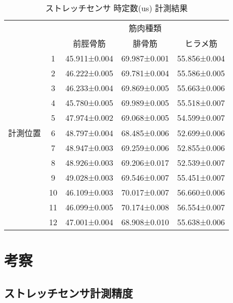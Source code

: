 \begin{table}[h]
    \caption{ストレッチセンサ 時定数(us) 計測結果}
        \begin{center}
            \begin{tabular}{|c|c|ccc|}\hline
            \multicolumn{2}{|c|}{} & \multicolumn{3}{c|}{筋肉種類}\\
            \cline{3-5}
            \multicolumn{2}{|c|}{} & 前脛骨筋 & 腓骨筋 & ヒラメ筋 \\ \hline
            & 1 & 45.911±0.004 & 69.987±0.001 & 55.856±0.004 \\ \cline{2-5}
            & 2 & 46.222±0.005 & 69.781±0.004 & 55.586±0.005 \\ \cline{2-5}
            & 3 & 46.233±0.004 & 69.869±0.005 & 55.663±0.006 \\ \cline{2-5}
            & 4 & 45.780±0.005 & 69.989±0.005 & 55.518±0.007 \\ \cline{2-5}
            & 5 & 47.974±0.002 & 69.068±0.005 & 54.599±0.007 \\ \cline{2-5}
            計測位置 & 6 & 48.797±0.004 & 68.485±0.006 & 52.699±0.006 \\ \cline{2-5}
            & 7 & 48.947±0.003 & 69.259±0.006 & 52.855±0.006 \\ \cline{2-5}
            & 8 & 48.926±0.003 & 69.206±0.017 & 52.539±0.007 \\ \cline{2-5}
            & 9 & 49.028±0.003 & 69.546±0.007 & 55.451±0.007 \\ \cline{2-5}
            & 10 & 46.109±0.003 & 70.017±0.007 & 56.660±0.006 \\ \cline{2-5}
            & 11 & 46.099±0.005 & 70.174±0.008 & 56.554±0.007 \\ \cline{2-5}
            & 12 & 47.001±0.004 & 68.908±0.010 & 55.638±0.006 \\ \hline
        \end{tabular}
    \end{center}
\end{table}

\section{考察}
\subsection{ストレッチセンサ計測精度}